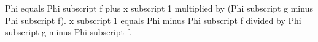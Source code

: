 Phi equals Phi subscript f plus x subscript 1 multiplied by (Phi subscript g minus Phi subscript f).  
x subscript 1 equals Phi minus Phi subscript f divided by Phi subscript g minus Phi subscript f.